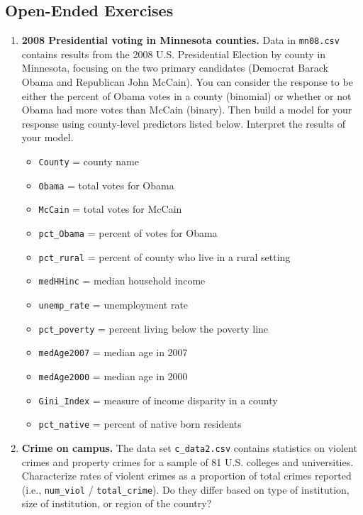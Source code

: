 \documentclass[
]{krantz}
\providecommand{\tightlist}{%
  \setlength{\itemsep}{0pt}\setlength{\parskip}{0pt}}
\begin{document}
\hypertarget{open-ended-exercises-3}{%
\subsection{Open-Ended Exercises}\label{open-ended-exercises-3}}

\begin{enumerate}
\def\labelenumi{\arabic{enumi}.}
\item
  \textbf{2008 Presidential voting in Minnesota counties.} Data in \texttt{mn08.csv} contains results from the 2008 U.S. Presidential Election by county in Minnesota, focusing on the two primary candidates (Democrat Barack Obama and Republican John McCain). You can consider the response to be either the percent of Obama votes in a county (binomial) or whether or not Obama had more votes than McCain (binary). Then build a model for your response using county-level predictors listed below. Interpret the results of your model.

  \begin{itemize}
  \tightlist
  \item
    \texttt{County} = county name
  \item
    \texttt{Obama} = total votes for Obama
  \item
    \texttt{McCain} = total votes for McCain
  \item
    \texttt{pct\_Obama} = percent of votes for Obama
  \item
    \texttt{pct\_rural} = percent of county who live in a rural setting
  \item
    \texttt{medHHinc} = median household income
  \item
    \texttt{unemp\_rate} = unemployment rate
  \item
    \texttt{pct\_poverty} = percent living below the poverty line
  \item
    \texttt{medAge2007} = median age in 2007
  \item
    \texttt{medAge2000} = median age in 2000
  \item
    \texttt{Gini\_Index} = measure of income disparity in a county
  \item
    \texttt{pct\_native} = percent of native born residents
  \end{itemize}
\item
  \textbf{Crime on campus.} The data set \texttt{c\_data2.csv} contains statistics on violent crimes and property crimes for a sample of 81 U.S. colleges and universities. Characterize rates of violent crimes as a proportion of total crimes reported (i.e., \texttt{num\_viol} / \texttt{total\_crime}). Do they differ based on type of institution, size of institution, or region of the country?


\end{enumerate}
\end{document}
